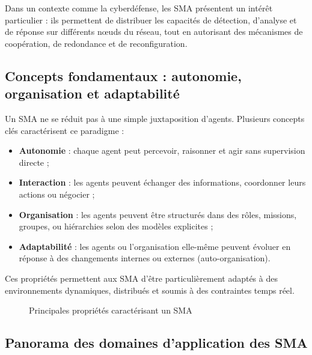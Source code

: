 \documentclass[ twoside,openright,titlepage,numbers=noenddot,headinclude,%
                footinclude=true,cleardoublepage=empty,abstractoff, %
                BCOR=5mm,paper=a4,fontsize=11pt,%
                french,american,%
                ]{scrreprt}
\begin{document}
Dans un contexte comme la cyberdéfense, les SMA présentent un intérêt particulier : ils permettent de distribuer les capacités de détection, d’analyse et de réponse sur différents nœuds du réseau, tout en autorisant des mécanismes de coopération, de redondance et de reconfiguration.

\vspace{0.5em}
\subsection*{Concepts fondamentaux : autonomie, organisation et adaptabilité}

Un SMA ne se réduit pas à une simple juxtaposition d’agents. Plusieurs concepts clés caractérisent ce paradigme :

\begin{itemize}
    \item \textbf{Autonomie} : chaque agent peut percevoir, raisonner et agir sans supervision directe ;
    \item \textbf{Interaction} : les agents peuvent échanger des informations, coordonner leurs actions ou négocier ;
    \item \textbf{Organisation} : les agents peuvent être structurés dans des rôles, missions, groupes, ou hiérarchies selon des modèles explicites ;
    \item \textbf{Adaptabilité} : les agents ou l’organisation elle-même peuvent évoluer en réponse à des changements internes ou externes (auto-organisation).
\end{itemize}

Ces propriétés permettent aux SMA d’être particulièrement adaptés à des environnements dynamiques, distribués et soumis à des contraintes temps réel.

\begin{figure}[H]
    \centering
    \caption{Principales propriétés caractérisant un SMA}
    \label{fig:sma-proprietes}
\end{figure}

\vspace{0.5em}
\subsection*{Panorama des domaines d’application des SMA}
\end{document}
